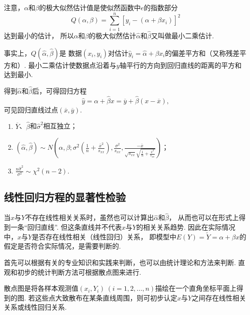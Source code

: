 注意，\(\alpha\)和\(\beta\)的极大似然估计值是使似然函数中\(e\)的指数部分\begin{equation*}
Q(\alpha,\beta) = \sum_{i=1}^n[y_i-(\alpha+\beta x_i)]^2
\end{equation*}
达到最小的估计，
所以\(\alpha\)和\(\beta\)的极大似然估计\(\hat{\alpha}\)和\(\hat{\beta}\)又叫做最小二乘估计.

事实上，\(Q(\hat{\alpha},\hat{\beta})\)是
数据\((x_i,y_i)\)对估计\(\hat{y}_i=\hat{\alpha}+\beta x_i\)的偏差平方和（又称残差平方和）.
最小二乘估计使数据点沿着与\(y\)轴平行的方向到回归直线的距离的平方和达到最小.

得到\(\hat{\alpha}\)和\(\hat{\beta}\)后，可得回归方程\begin{equation*}
\hat{y} = \hat{\alpha} + \hat{\beta} x
= \overline{y} + \hat{\beta} (x - \overline{x}),
\end{equation*}可见回归直线过点\((\overline{x},\overline{y})\).

\begin{theorem}
\begin{enumerate}
\item \(\overline{Y}\)、\(\hat{\beta}\)和\(\hat{\sigma}^2\)相互独立；
\item \((\hat{\alpha},\hat{\beta}) \sim N\left(
	\alpha, \beta;
	\sigma^2 \left( \frac{1}{n} + \frac{\overline{x}^2}{s_{xx}} \right),
	\frac{\sigma^2}{s_{xx}},
	\frac{-\overline{x}}{
		\sqrt{s_{xx}} \sqrt{\frac{1}{n} + \frac{\overline{x}^2}{s_{xx}}}
	}
\right)\)；
\item \(\frac{n \hat{\sigma}^2}{\sigma^2} \sim \chi^2(n-2)\).
\end{enumerate}
\end{theorem}

\subsection{线性回归方程的显著性检验}
当\(x\)与\(Y\)不存在线性相关关系时，虽然也可以计算出\(\hat{\alpha}\)和\(\hat{\beta}\)，
从而也可以在形式上得到一条“回归直线”.
但这条直线并不代表\(x\)与\(Y\)的相关关系趋势.
因此在实际情况中，\(x\)与\(Y\)是否存在线性相关（线性回归）关系，
即模型中\(E(Y) = \widetilde{Y} = \alpha + \beta x\)的假定是否符合实际情况，是需要判断的.

首先可以根据有关的专业知识和实践来判断，也可以由统计理论和方法来判断.
直观和初步的统计判断方法可根据散点图来进行.

散点图是将各样本观测值\((x_i,Y_i)\ (i=1,2,\dotsc,n)\)描绘在一个直角坐标平面上得到的图.
若这些点大致散布在某条直线周围，则可初步认定\(x\)与\(Y\)之间存在线性相关关系或线性回归关系.

